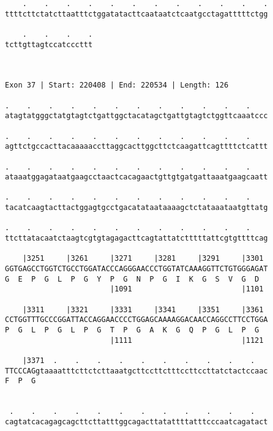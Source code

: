 \documentclass{article}
\begin{document}
\begin{Verbatim}
    .    .    .    .    .    .    .    .    .    .    .    .
ttttcttctatcttaatttctggatatacttcaataatctcaatgcctagatttttctgg
                                                            
    .    .    .    .
tcttgttagtccatcccttt
                    
                    
 
Exon 37 | Start: 220408 | End: 220534 | Length: 126
 
.    .    .    .    .    .    .    .    .    .    .    .    
atagtatgggctatgtagtctgattggctacatagctgattgtagtctggttcaaatccc
                                                            
.    .    .    .    .    .    .    .    .    .    .    .    
agttctgccacttacaaaaaccttaggcacttggcttctcaagattcagttttctcattt
                                                            
.    .    .    .    .    .    .    .    .    .    .    .    
ataaatggagataatgaagcctaactcacagaactgttgtgatgattaaatgaagcaatt
                                                            
.    .    .    .    .    .    .    .    .    .    .    .    
tacatcaagtacttactggagtgcctgacatataataaaagctctataaataatgttatg
                                                            
.    .    .    .    .    .    .    .    .    .    .    .    
ttcttatacaatctaagtcgtgtagagacttcagtattatctttttattcgtgttttcag
                                                            
    |3251     |3261     |3271     |3281     |3291     |3301 
GGTGAGCCTGGTCTGCCTGGATACCCAGGGAACCCTGGTATCAAAGGTTCTGTGGGAGAT
G  E  P  G  L  P  G  Y  P  G  N  P  G  I  K  G  S  V  G  D  
                        |1091                         |1101 
  
    |3311     |3321     |3331     |3341     |3351     |3361 
CCTGGTTTGCCCGGATTACCAGGAACCCCTGGAGCAAAAGGACAACCAGGCCTTCCTGGA
P  G  L  P  G  L  P  G  T  P  G  A  K  G  Q  P  G  L  P  G  
                        |1111                         |1121 
  
    |3371  .    .    .    .    .    .    .    .    .    .   
TTCCCAGgtaaaatttcttctcttaaatgcttccttctttccttccttatctactccaac
F  P  G                                                     
                                                            
  
 .    .    .    .    .    .    .    .    .    .    .    .   
cagtatcacagagcagcttcttatttggcagacttatattttatttcccaatcagatact
                                                            

\end{Verbatim}
\end{document}
